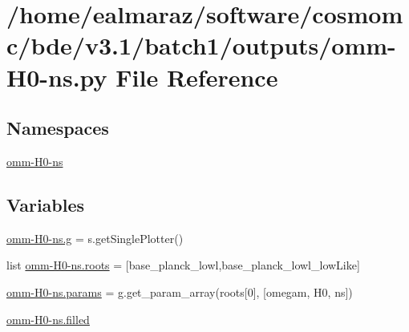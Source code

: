 \hypertarget{omm-H0-ns_8py}{}\section{/home/ealmaraz/software/cosmomc/bde/v3.1/batch1/outputs/omm-\/\+H0-\/ns.py File Reference}
\label{omm-H0-ns_8py}
\subsection*{Namespaces}
\begin{DoxyCompactItemize}
\item 
 \mbox{\hyperlink{namespaceomm-H0-ns}{omm-\/\+H0-\/ns}}
\end{DoxyCompactItemize}
\subsection*{Variables}
\begin{DoxyCompactItemize}
\item 
\mbox{\hyperlink{namespaceomm-H0-ns_a9c190517e0bb271ea74c52de561029ae}{omm-\/\+H0-\/ns.\+g}} = s.\+get\+Single\+Plotter()
\item 
list \mbox{\hyperlink{namespaceomm-H0-ns_ada743c36e65bde6d6e4ca0ae0cf1bbbe}{omm-\/\+H0-\/ns.\+roots}} = \mbox{[}\textquotesingle{}base\+\_\+planck\+\_\+lowl\textquotesingle{},\textquotesingle{}base\+\_\+planck\+\_\+lowl\+\_\+low\+Like\textquotesingle{}\mbox{]}
\item 
\mbox{\hyperlink{namespaceomm-H0-ns_a279cdba8cd2ded2eea0d11344dfa2596}{omm-\/\+H0-\/ns.\+params}} = g.\+get\+\_\+param\+\_\+array(roots\mbox{[}0\mbox{]}, \mbox{[}\textquotesingle{}omegam\textquotesingle{}, \textquotesingle{}H0\textquotesingle{}, \textquotesingle{}ns\textquotesingle{}\mbox{]})
\item 
\mbox{\hyperlink{namespaceomm-H0-ns_a793225134a37fd8e80e2a50e58f9c5c3}{omm-\/\+H0-\/ns.\+filled}}
\end{DoxyCompactItemize}
